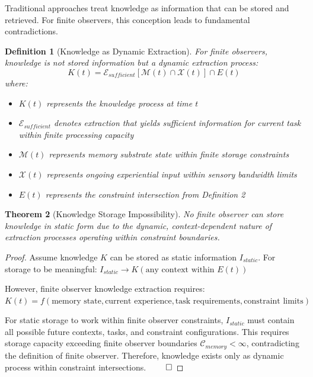 \documentclass[12pt,a4paper]{article}
\newtheorem{theorem}{Theorem}
\newtheorem{definition}[theorem]{Definition}
\begin{document}
Traditional approaches treat knowledge as information that can be stored and retrieved. For finite observers, this conception leads to fundamental contradictions.

\begin{definition}[Knowledge as Dynamic Extraction]
For finite observers, knowledge is not stored information but a dynamic extraction process:
\begin{equation}
K(t) = \mathcal{E}_{sufficient}[\mathcal{M}(t) \cap \mathcal{X}(t)] \cap E(t)
\end{equation}
where:
\begin{itemize}
\item $K(t)$ represents the knowledge process at time $t$
\item $\mathcal{E}_{sufficient}$ denotes extraction that yields sufficient information for current task within finite processing capacity
\item $\mathcal{M}(t)$ represents memory substrate state within finite storage constraints
\item $\mathcal{X}(t)$ represents ongoing experiential input within sensory bandwidth limits
\item $E(t)$ represents the constraint intersection from Definition 2
\end{itemize}
\end{definition}

\begin{theorem}[Knowledge Storage Impossibility]
No finite observer can store knowledge in static form due to the dynamic, context-dependent nature of extraction processes operating within constraint boundaries.
\end{theorem}

\begin{proof}
Assume knowledge $K$ can be stored as static information $I_{static}$. For storage to be meaningful:
$I_{static} \rightarrow K(\text{any context within } E(t))$

However, finite observer knowledge extraction requires:
$K(t) = f(\text{memory state}, \text{current experience}, \text{task requirements}, \text{constraint limits})$

For static storage to work within finite observer constraints, $I_{static}$ must contain all possible future contexts, tasks, and constraint configurations. This requires storage capacity exceeding finite observer boundaries $\mathcal{C}_{memory} < \infty$, contradicting the definition of finite observer. Therefore, knowledge exists only as dynamic process within constraint intersections. $\qed$
\end{proof}
\end{document}
